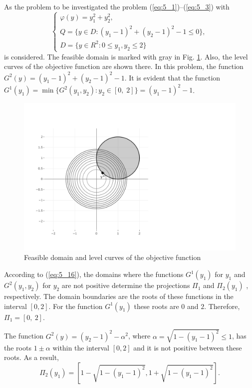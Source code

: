\begin{example}
\label {exam:5_1}
As the problem to be investigated  the problem (\ref{eq:5_1})--(\ref{eq:5_3}) with 
\begin{equation}
\label{eq:5_26}
  \begin{cases}
    \varphi(y)=y_1^2+y_2^2,\\
   Q=\{y\in D:(y_1-1)^2+(y_2-1)^2-1\leq 0\}, \\
	D=\{y\in R^2:0\leq y_1,y_2\leq 2\}
  \end{cases}
\end{equation}
is considered. The feasible domain is marked with gray in Fig. \ref{fig:5_4}. Also, the level curves of the objective function are shown there. In this problem, the function $G^2(y)=(y_1-1)^2+(y_2-1)^2-1$. It is evident that the function  $G^1(y_1)=\min\{G^2(y_1,y_2):y_2\in [0,\;2]\}=(y_1-1)^2-1$. 
\begin{figure}[t]
\centering
\includegraphics[width=1.1\linewidth]{figures/figure_5_4.pdf}
\caption{Feasible domain and level curves of the objective function}
\label{fig:5_4}    
\end{figure}

According to (\ref{eq:5_16}), the domains where the functions $G^1(y_1)$  for $y_1$  and $G^2(y_1,y_2)$  for $y_2$  are not positive determine the projections $\Pi_1$  and $\Pi_2(y_1)$ , respectively. The domain boundaries are the roots of these functions in the interval $[0,2]$. For the function $G^1(y_1)$  these roots are $0$ and $2$. Therefore, $\Pi_1=[0,\:2]$.

The function $G^2(y)=(y_2-1)^2-\alpha^2$, where $\alpha=\sqrt{1-(y_1-1)^2}\leq 1$,  has the roots $1\pm \alpha$ within the interval $[0,2]$ and  it is not positive between these roots. As a result, 
\begin{equation}
\label{eq:5_27}
\Pi_2(y_1)=[1-\sqrt{1-(y_1-1)^2},1+\sqrt{1-(y_1-1)^2}].
\end{equation}


\end{example}
